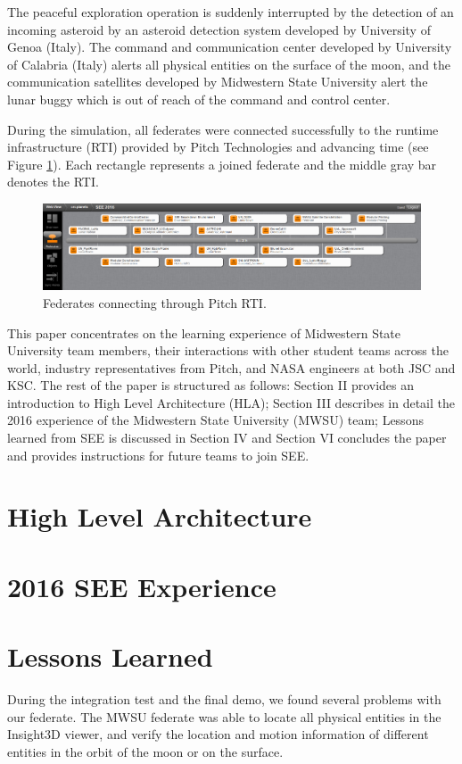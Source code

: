 \documentclass[conference]{IEEEtran}
\begin{document}
The peaceful exploration operation is suddenly interrupted by the detection of an incoming asteroid by an asteroid detection system developed by University of Genoa (Italy). The command and communication center \cite{falcone2014simulation} developed by University of Calabria (Italy) alerts all physical entities on the surface of the moon, and the communication satellites developed by Midwestern State University alert the lunar buggy which is out of reach of the command and control center.

During the simulation, all federates were connected successfully to the runtime infrastructure (RTI) provided by Pitch Technologies and advancing time (see Figure \ref{Federation}). Each rectangle represents a joined federate and the middle gray bar denotes the RTI.
\begin{figure}[!htbp]
	\centering
		\includegraphics[width=\linewidth]{Pitch.PNG}
		\caption{Federates connecting through Pitch RTI.}
	\label{Federation}
\end{figure}

This paper concentrates on the learning experience of Midwestern State University team members, their interactions with other student teams across the world, industry representatives from Pitch, and NASA engineers at both JSC and KSC.  The rest of the paper is structured as follows: Section II provides an introduction to High Level Architecture (HLA); Section III describes in detail the 2016 experience of the Midwestern State University (MWSU) team; Lessons learned from SEE is discussed in Section IV and Section VI concludes the paper and provides instructions for future teams to join SEE.

\section{High Level Architecture}

\section{2016 SEE Experience}

\section{Lessons Learned}
During the integration test and the final demo, we found several problems with our federate.  The MWSU federate was able to locate all physical entities in the Insight3D viewer, and verify the location and motion information of different entities in the orbit of the moon or on the surface.  
\end{document}
